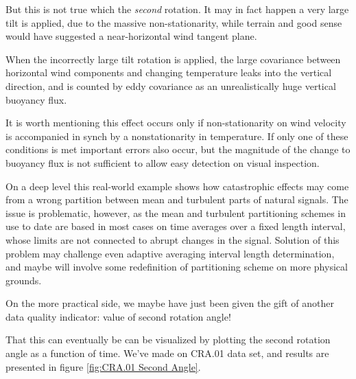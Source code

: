 \documentclass[a4paper,10pt]{book}
\begin{document}
But this is not true which the \emph{second} rotation. It may in fact happen a very large tilt is applied, due to the massive non-stationarity, while terrain and good sense would have suggested a near-horizontal wind tangent plane.

When the incorrectly large tilt rotation is applied, the large covariance between horizontal wind components and changing temperature leaks into the vertical direction, and is counted by eddy covariance as an unrealistically huge vertical buoyancy flux.

It is worth mentioning this effect occurs only if non-stationarity on wind velocity is accompanied in synch by a nonstationarity in temperature. If only one of these conditions is met important errors also occur, but the magnitude of the change to buoyancy flux is not sufficient to allow easy detection on visual inspection.

On a deep level this real-world example shows how catastrophic effects may come from a wrong partition between mean and turbulent parts of natural signals. The issue is problematic, however, as the mean and turbulent partitioning schemes in use to date are based in most cases on time averages over a fixed length interval, whose limits are not connected to abrupt changes in the signal. Solution of this problem may challenge even adaptive averaging interval length determination, and maybe will involve some redefinition of partitioning scheme on more physical grounds.

On the more practical side, we maybe have just been given the gift of another data quality indicator: value of second rotation angle!

That this can eventually be can be visualized by plotting the second rotation angle as a function of time. We've made on CRA.01 data set, and results are presented in figure \ref{fig:CRA.01 Second Angle}.
\end{document}
